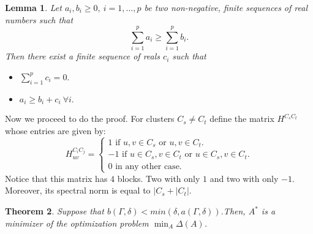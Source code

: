 \documentclass[12pt]{amsart}
\newtheorem{lemma}{Lemma}[section]
\newtheorem{theorem}[lemma]{Theorem}
\theoremstyle{remark}
\begin{document}
\begin{lemma}
Let $a_i,b_i \geq 0, \ i = 1,\dots,p$ be two non-negative, finite sequences of real numbers such that
\[
\sum_{i=1}^{p}a_i \geq \sum_{i=1}^{p}b_i.
\]
Then there exist a finite sequence of reals $c_i$ such that
\begin{itemize}
\item $\sum_{i=1}^p c_i=0.$
\item $a_i \geq b_i+c_i \  \forall i.$
\end{itemize}
\end{lemma}


Now we proceed to do the proof. For  clusters $C_s\neq C_t$ define the matrix $H^{C_sC_t}$ whose entries are given by: 
\[
H^{C_iC_j}_{uv}= 
\begin{cases}
1 \text{ if } u,v \in C_s \text{ or } u,v \in C_t. \\
-1 \text{ if } u \in C_s, v \in C_t \text{ or } u \in C_s, v\in C_t. \\
0 \text{ in any other case.}
\end{cases}
\]
Notice that this matrix has $4$ blocks. Two with only $1$ and two with only $-1$. Moreover, its spectral norm is equal to $|C_s+|C_t|$.

\begin{theorem}\label{lemma: transport2}
Suppose that $ b(\Gamma,\delta) < min(\delta,a(\Gamma,\delta))$.Then,
$A^*$ is a minimizer of the optimization problem $\min_A\Delta(A)$. 
\end{theorem}
\end{document}

